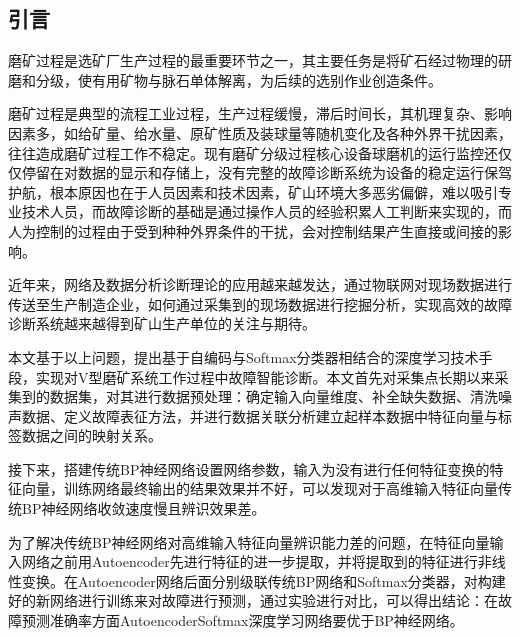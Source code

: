 \documentclass{ctacn}%
\begin{document}


\maketitle




\begin{multicols}{2}
\section{引\quad 言}
磨矿过程是选矿厂生产过程的最重要环节之一，其主要任务是将矿石经过物理的研磨和分级，使有用矿物与脉石单体解离，为后续的选别作业创造条件。

磨矿过程是典型的流程工业过程，生产过程缓慢，滞后时间长，其机理复杂、影响因素多，如给矿量、给水量、原矿性质及装球量等随机变化及各种外界干扰因素，往往造成磨矿过程工作不稳定。现有磨矿分级过程核心设备球磨机的运行监控还仅仅停留在对数据的显示和存储上，没有完整的故障诊断系统为设备的稳定运行保驾护航，根本原因也在于人员因素和技术因素，矿山环境大多恶劣偏僻，难以吸引专业技术人员，而故障诊断的基础是通过操作人员的经验积累人工判断来实现的，而人为控制的过程由于受到种种外界条件的干扰，会对控制结果产生直接或间接的影响。

近年来，网络及数据分析诊断理论的应用越来越发达，通过物联网对现场数据进行传送至生产制造企业，如何通过采集到的现场数据进行挖掘分析，实现高效的故障诊断系统越来越得到矿山生产单位的关注与期待。

本文基于以上问题，提出基于自编码与Softmax分类器相结合的深度学习技术手段，实现对V型磨矿系统工作过程中故障智能诊断。本文首先对采集点长期以来采集到的数据集，对其进行数据预处理：确定输入向量维度、补全缺失数据、清洗噪声数据、定义故障表征方法，并进行数据关联分析建立起样本数据中特征向量与标签数据之间的映射关系。

接下来，搭建传统BP神经网络设置网络参数，输入为没有进行任何特征变换的特征向量，训练网络最终输出的结果效果并不好，可以发现对于高维输入特征向量传统BP神经网络收敛速度慢且辨识效果差。

为了解决传统BP神经网络对高维输入特征向量辨识能力差的问题，在特征向量输入网络之前用Autoencoder先进行特征的进一步提取，并将提取到的特征进行非线性变换。在Autoencoder网络后面分别级联传统BP网络和Softmax分类器，对构建好的新网络进行训练来对故障进行预测，通过实验进行对比，可以得出结论：在故障预测准确率方面AutoencoderSoftmax深度学习网络要优于BP神经网络。


\end{multicols}
\end{document}
